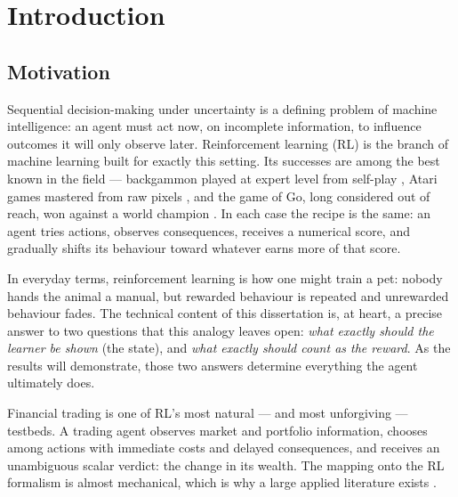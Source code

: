 \chapter{Introduction}
\label{ch:introduction}

\section{Motivation}
\label{sec:intro_motivation}

Sequential decision-making under uncertainty is a defining problem of
machine intelligence: an agent must act now, on incomplete information,
to influence outcomes it will only observe later. Reinforcement learning
(RL) is the branch of machine learning built for exactly this setting.
Its successes are among the best known in the field --- backgammon played
at expert level from self-play \cite{tesauro1995}, Atari games mastered
from raw pixels \cite{mnih2015}, and the game of Go, long considered out
of reach, won against a world champion \cite{silver2016}. In each case
the recipe is the same: an agent tries actions, observes consequences,
receives a numerical score, and gradually shifts its behaviour toward
whatever earns more of that score.

In everyday terms, reinforcement learning is how one might train a pet:
nobody hands the animal a manual, but rewarded behaviour is repeated and
unrewarded behaviour fades. The technical content of this dissertation
is, at heart, a precise answer to two questions that this analogy leaves
open: \emph{what exactly should the learner be shown} (the state), and
\emph{what exactly should count as the reward}. As the results will
demonstrate, those two answers determine everything the agent ultimately
does.

Financial trading is one of RL's most natural --- and most unforgiving
--- testbeds. A trading agent observes market and portfolio information,
chooses among actions with immediate costs and delayed consequences, and
receives an unambiguous scalar verdict: the change in its wealth. The
mapping onto the RL formalism is almost mechanical, which is why a large
applied literature exists \cite{moody2001, deng2017, liu2020finrl}.

